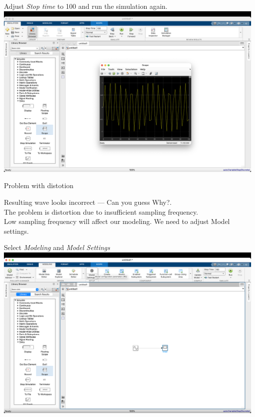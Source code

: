 \begin{frame}{Adjust \textit{Stop time} to 100 and run the simulation again.}
    \hspace*{-11mm}
    \includegraphics[width=\paperwidth]{lesson_2/images/simulink_screen_07.png}
\end{frame}

\begin{frame}{Problem with distotion}
\Large
\begin{center}
    Resulting wave looks incorrect --- Can you guess Why?.\\
    \pause
    \vfill
    The problem is distortion due to insufficient sampling frequency.\\
    \pause
    \vfill
    Low sampling frequency will affect our modeling. We need to adjust Model settings. 
\end{center}
\end{frame}


\begin{frame}{Select \textit{Modeling} and  \textit{Model Settings} }
    \hspace*{-11mm}
    \includegraphics[width=\paperwidth]{lesson_2/images/simulink_screen_08.png}
\end{frame}

